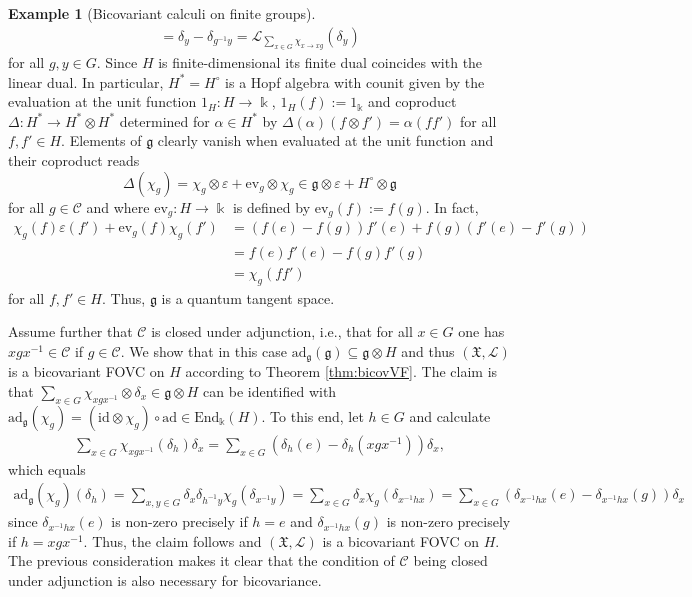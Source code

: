 \documentclass{article}
\theoremstyle{definition}
\newtheorem{example}[thm]{Example}
\begin{document}
\begin{example}[Bicovariant calculi on finite groups]
\begin{align*}
			=\delta_y-\delta_{g^{-1}y}
			=\mathscr{L}_{\sum_{x\in G}\chi_{x\to xg}}(\delta_y)
		\end{align*}
		for all $g,y\in G$.
		Since $H$ is finite-dimensional its finite dual coincides with the linear dual. In particular, $H^*=H^\circ$ is a Hopf algebra with counit given by the evaluation at the unit function $1_H\colon H\to\Bbbk$, $1_H(f):=1_\Bbbk$ and coproduct $\Delta\colon H^*\to H^*\otimes H^*$ determined for $\alpha\in H^*$ by $\Delta(\alpha)(f\otimes f')=\alpha(ff')$ for all $f,f'\in H$. Elements of $\mathfrak{g}$ clearly vanish when evaluated at the unit function and their coproduct reads
		\begin{equation}
			\Delta(\chi_g)=\chi_g\otimes\varepsilon+\mathrm{ev}_g\otimes\chi_g\in\mathfrak{g}\otimes\varepsilon+ H^\circ\otimes\mathfrak{g}
		\end{equation}
		for all $g\in\mathcal{C}$ and where $\mathrm{ev}_g\colon H\to\Bbbk$ is defined by $\mathrm{ev}_g(f):=f(g)$. In fact,
		\begin{align*}
			\chi_g(f)\varepsilon(f')+\mathrm{ev}_g(f)\chi_g(f')
			&=(f(e)-f(g))f'(e)+f(g)(f'(e)-f'(g))\\
			&=f(e)f'(e)-f(g)f'(g)\\
			&=\chi_g(ff')
		\end{align*}
		for all $f,f'\in H$. Thus, $\mathfrak{g}$ is a quantum tangent space.
		
		Assume further that $\mathcal{C}$ is closed under adjunction, i.e., that for all $x\in G$ one has $xgx^{-1}\in\mathcal{C}$ if $g\in\mathcal{C}$. We show that in this case $\mathrm{ad}_\mathfrak{g}(\mathfrak{g})\subseteq\mathfrak{g}\otimes H$ and thus $(\mathfrak{X},\mathscr{L})$ is a bicovariant FOVC on $H$ according to Theorem \ref{thm:bicovVF}.
		The claim is that $\sum_{x\in G}\chi_{xgx^{-1}}\otimes\delta_x\in\mathfrak{g}\otimes H$ can be identified with $\mathrm{ad}_\mathfrak{g}(\chi_g)=(\mathrm{id}\otimes\chi_g)\circ\mathrm{ad}\in\mathrm{End}_\Bbbk(H)$.
		To this end, let $h\in G$ and calculate
		\begin{align*}
			\sum_{x\in G}\chi_{xgx^{-1}}(\delta_h)\delta_x
			=\sum_{x\in G}(\delta_h(e)-\delta_h(xgx^{-1}))\delta_x,
		\end{align*}
		which equals
		\begin{align*}
			\mathrm{ad}_\mathfrak{g}(\chi_g)(\delta_h)
			=\sum_{x,y\in G}\delta_x\delta_{h^{-1}y}\chi_g(\delta_{x^{-1}y})
			=\sum_{x\in G}\delta_x\chi_g(\delta_{x^{-1}hx})
			=\sum_{x\in G}(\delta_{x^{-1}hx}(e)-\delta_{x^{-1}hx}(g))\delta_x
		\end{align*}
		since $\delta_{x^{-1}hx}(e)$ is non-zero precisely if $h=e$ and $\delta_{x^{-1}hx}(g)$ is non-zero precisely if $h=xgx^{-1}$.
		Thus, the claim follows and $(\mathfrak{X},\mathscr{L})$ is a bicovariant FOVC on $H$.
		The previous consideration makes it clear that the condition of $\mathcal{C}$ being closed under adjunction is also necessary for bicovariance.
	\end{example}
\end{document}
